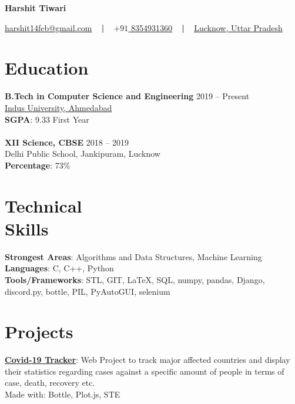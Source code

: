 \documentclass[margin, centered]{res}
\begin{document}
	\begin{center}
		\hspace{-\hoffset}
		\huge\bf{Harshit Tiwari}
	\end{center}
	\begin{center}
		\hspace{-\hoffset}
		\href{mailto:harshit14feb@gmail.com}{harshit14feb@gmail.com}
		~ \textbf{|} ~
		\href{tel:+919532655323}{\(+91\) 8354931360}
		~ \textbf{|} ~
		\href{https://goo.gl/maps/Sh5vC8Vo78Y3cWfr9}{Lucknow, Uttar Pradesh}
	\end{center}

	\begin{resume}
		\section{Education}
			\textbf{B.Tech in Computer Science and Engineering} \hfill 2019 – Present \\
			\href{https://www.indusuni.ac.in/}{Indus University, Ahmedabad}\\
			\textbf{SGPA}: 9.33 First Year \\ 
			\\
			\textbf{XII Science, CBSE} \hfill 2018 – 2019 \\
			Delhi Public School, Jankipuram, Lucknow \\
			\textbf{Percentage}: 73\%
		
		\section{Technical \\ Skills}
			\textbf{Strongest Areas}: Algorithms and Data Structures, Machine Learning\\
			\textbf{Languages}: C, C++, Python\\
			\textbf{Tools/Frameworks}: STL, GIT, \LaTeX, SQL, numpy, pandas, Django, discord.py, bottle, PIL, PyAutoGUI, selenium

		
		\section{Projects}
			\textbf{\href{https://github.com/FireFeathers06/covid-19}{Covid-19 Tracker}}:
			Web Project to track major affected countries and display their statistics regarding 
			cases against a specific amount of people in terms of case, death, recovery etc.\\
			Made with: Bottle, Plot.js, STE
			\\ \\
			

\end{resume}
\end{document}
